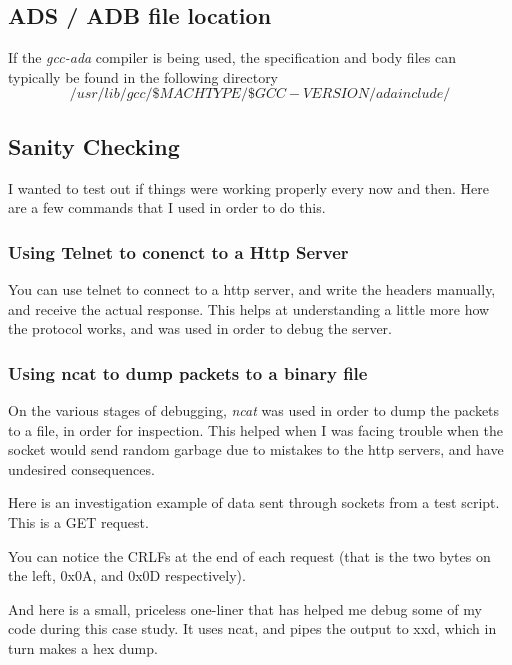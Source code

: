 \subsection{ADS / ADB file location}
If the \textit{gcc-ada} compiler is being used, the specification and body files can typically be found in the following directory
$$ /usr/lib/gcc/\$MACHTYPE/\$GCC-VERSION/adainclude/ $$

\subsection{Sanity Checking}
I wanted to test out if things were working properly every now and then. Here are a few commands that I used in order to do this.

\subsubsection{Using Telnet to conenct to a Http Server}
You can use telnet to connect to a http server, and write the headers manually, and receive the actual response. This helps at understanding a little more how the protocol works, and was used in order to debug the server.
\\


\subsubsection{Using ncat to dump packets to a binary file}
On the various stages of debugging, \textit{ncat} was used in order to dump the packets to a file, in order for inspection. This helped when I was facing trouble when the socket would send random garbage due to mistakes to the http servers, and have undesired consequences. 



Here is an investigation example of data sent through sockets from a test script. This is a GET request.

You can notice the CRLFs at the end of each request (that is the two bytes on the left, 0x0A, and 0x0D respectively).

And here is a small, priceless one-liner that has helped me debug some of my code during this case study. It uses ncat, and pipes the output to xxd, which in turn makes a hex dump.


